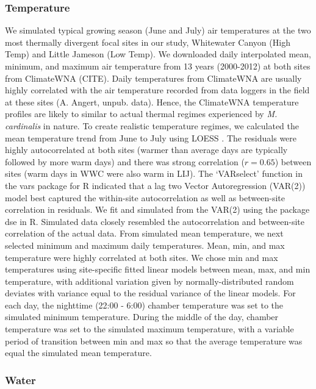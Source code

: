 \documentclass[11pt, oneside]{article}
\begin{document}
\subsubsection*{Temperature}

We simulated typical growing season (June and July) air temperatures at the two most thermally divergent focal sites in our study, Whitewater Canyon (High Temp) and Little Jameson (Low Temp). We downloaded daily interpolated mean, minimum, and maximum air temperature from 13 years (2000-2012) at both sites from ClimateWNA (CITE). Daily temperatures from ClimateWNA are usually highly correlated with the air temperature recorded from data loggers in the field at these sites (A. Angert, unpub. data). Hence, the ClimateWNA temperature profiles are likely to similar to actual thermal regimes experienced by \textit{M. cardinalis} in nature. To create realistic temperature regimes, we calculated the mean temperature trend from June to July using LOESS \citep{Cleveland_etal_1992}. The residuals were highly autocorrelated at both sites (warmer than average days are typically followed by more warm days) and there was strong correlation ($r = 0.65$) between sites (warm days in WWC were also warm in LIJ). The `VARselect' function in the vars package for R \citep{Pfaff_2008} indicated that a lag two Vector Autoregression (VAR(2)) model best captured the within-site autocorrelation as well as between-site correlation in residuals. We fit and simulated from the VAR(2) using the package dse \citep{Gilbert_2006?} in R. Simulated data closely resembled the autocorrelation and between-site correlation of the actual data. From simulated mean temperature, we next selected minimum and maximum daily temperatures. Mean, min, and max temperature were highly correlated at both sites. We chose min and max temperatures using site-specific fitted linear models between mean, max, and min temperature, with additional variation given by normally-distributed random deviates with variance equal to the residual variance of the linear models. For each day, the nighttime (22:00 - 6:00) chamber temperature was set to the simulated minimum temperature. During the middle of the day, chamber temperature was set to the simulated maximum temperature, with a variable period of transition between min and max so that the average temperature was equal the simulated mean temperature.

\subsubsection*{Water}
\end{document}
